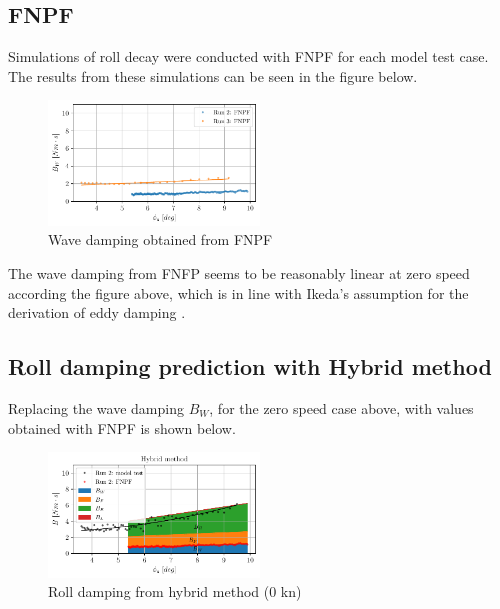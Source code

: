     \subsection{FNPF}\label{fnpf}

Simulations of roll decay were conducted with FNPF for each model test
case. The results from these simulations can be seen in the figure
below.

    \begin{figure}[H]
        \begin{center}\includegraphics[width = 0.5\textwidth]{figures/fnpf.pdf}\end{center}
        \vspace{-1cm}
        \caption{Wave damping obtained from FNPF}
        \label{fig:fnpf}
    \end{figure}
    
    The wave damping from FNFP seems to be reasonably linear at zero speed
according the figure above, which is in line with Ikeda's assumption for
the derivation of eddy damping \cite{7505983/4AFVVGNT}.

    \subsection{Roll damping prediction with Hybrid
method}\label{roll-damping-prediction-with-hybrid-method}
Replacing the wave damping $B_W$, for the zero speed case above, with values obtained with FNPF is shown below. 
    \begin{figure}[H]
        \begin{center}\includegraphics[width = 0.5\textwidth]{figures/hybrid_0.pdf}\end{center}
        \vspace{-1cm}
        \caption{Roll damping from hybrid method (0 kn)}
        \label{fig:hybrid_0}
    \end{figure}
    
